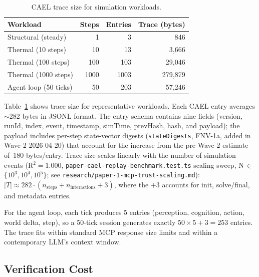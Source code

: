 \documentclass[letterpaper,twocolumn,10pt]{article}
\providecommand{\measuredFrom}[1]{}
\begin{document}
\begin{table}[t]
  \centering
  \caption{CAEL trace size for simulation workloads.}
  \label{tab:tracesize}
  \footnotesize
  \measuredFrom{HoloScript/packages/engine/src/simulation/__tests__/paper-cael-replay-benchmark.test.ts}%
  \measuredFrom{research/paper-1-mcp-trust-scaling.md}%
  \begin{tabular}{@{}lrrr@{}}
    \toprule
    Workload & Steps & Entries & Trace (bytes) \\
    \midrule
    Structural (steady) & 1    & 3    & 846     \\
    Thermal (10 steps)  & 10   & 13   & 3,666   \\
    Thermal (100 steps) & 100  & 103  & 29,046  \\
    Thermal (1000 steps)& 1000 & 1003 & 279,879 \\
    Agent loop (50 ticks)& 50  & 203  & 57,246  \\
    \bottomrule
  \end{tabular}
\end{table}

Table~\ref{tab:tracesize} shows trace size for representative workloads. Each
CAEL entry averages $\sim$282 bytes in JSONL format. The entry schema contains
nine fields (version, runId, index, event, timestamp, simTime, prevHash,
hash, and payload); the payload includes per-step state-vector digests
(\texttt{stateDigests}, FNV-1a, added in Wave-2 2026-04-20) that account for
the increase from the pre-Wave-2 estimate of~180 bytes/entry. Trace size
scales linearly with the number of simulation events (R$^2 = 1.000$,
\texttt{paper-cael-replay-benchmark.test.ts} scaling sweep, N\,$\in$\,$\{10^3,
10^4, 10^5\}$; see \texttt{research/paper-1-mcp-trust-scaling.md}):
$|T| \approx 282 \cdot (n_{\text{steps}} + n_{\text{interactions}} + 3)$,
where the $+3$ accounts for init, solve/final, and metadata entries.

For the agent loop, each tick produces 5 entries (perception, cognition,
action, world delta, step), so a 50-tick session generates exactly
$50 \times 5 + 3 = 253$ entries. The trace fits within standard MCP
response size limits and within a contemporary LLM's context window.

\subsection{Verification Cost}
\label{sec:eval-verify}
\end{document}
